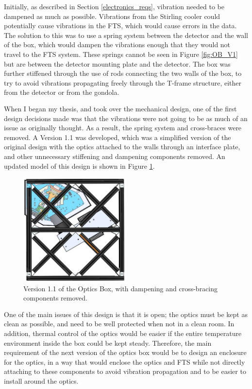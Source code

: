 Initially, as described in Section \ref{electronics_reqs}, vibration needed to be dampened as much as possible. Vibrations from the Stirling cooler could potentially cause vibrations in the FTS, which would cause errors in the data. The solution to this was to use a spring system between the detector and the wall of the box, which would dampen the vibrations enough that they would not travel to the FTS system. These springs cannot be seen in Figure \ref{fig:OB_V1} but are between the detector mounting plate and the detector. The box was further stiffened through the use of rods connecting the two walls of the box, to try to avoid vibrations propagating freely through the T-frame structure, either from the detector or from the gondola.

When I began my thesis, and took over the mechanical design, one of the first design decisions made was that the vibrations were not going to be as much of an issue as originally thought. As a result, the spring system and cross-braces were removed. A Version 1.1 was developed, which was a simplified version of the original design with the optics attached to the walls through an interface plate, and other unnecessary stiffening and dampening components removed. An updated model of this design is shown in Figure \ref{fig:OB_V1.1}.

\begin{figure}
    \centering
    \includegraphics[width=0.5\textwidth]{chap3_images/LIFE_V1_images/Optics_Box_V0_5_front_view.JPG}
    \caption{Version 1.1 of the Optics Box, with dampening and cross-bracing components removed.}
    \label{fig:OB_V1.1}
\end{figure}

One of the main issues of this design is that it is open; the optics must be kept as clean as possible, and need to be well protected when not in a clean room. In addition, thermal control of the optics would be easier if the entire temperature environment inside the box could be kept steady. Therefore, the main requirement of the next version of the optics box would be to design an enclosure for the optics, in a way that would enclose the optics and FTS while not directly attaching to these components to avoid vibration propagation and to be easier to install around the optics. 

